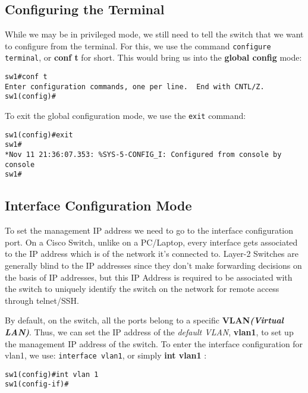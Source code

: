 \subsection{Configuring the Terminal}
While we may be in privileged mode, we still need to tell the switch that we want to configure from the terminal. For this, we use the command \verb|configure terminal|, or \textbf{conf t} for short. This would bring us into the \textbf{global config} mode:

\vspace{-15pt}
\begin{verbatim}
sw1#conf t
Enter configuration commands, one per line.  End with CNTL/Z.
sw1(config)#
\end{verbatim}
\vspace{-10pt}

\noindent
To exit the global configuration mode, we use the \verb|exit| command:

\vspace{-15pt}
\begin{verbatim}
sw1(config)#exit
sw1#
*Nov 11 21:36:07.353: %SYS-5-CONFIG_I: Configured from console by console
sw1#
\end{verbatim}
\vspace{-10pt}

\subsection{Interface Configuration Mode}
To set the management IP address we need to go to the interface configuration port. On a Cisco Switch, unlike on a PC/Laptop, every interface gets associated to the IP address which is of the network it's connected to. Layer-2 Switches are generally blind to the IP addresses since they don't make forwarding decisions on the basis of IP addresses, but this IP Address is required to be associated with the switch to uniquely identify the switch on the network for remote access through telnet/SSH. 

By default, on the switch, all the ports belong to a specific \textbf{VLAN\textit{(Virtual LAN)}}. Thus, we can set the IP address of the \textit{default VLAN}, \textbf{vlan1}, to set up the management IP address of the switch. To enter the interface configuration for vlan1, we use: \verb|interface vlan1|, or simply \textbf{int vlan1} :

\vspace{-15pt}
\begin{verbatim}
sw1(config)#int vlan 1
sw1(config-if)#
\end{verbatim}
\vspace{-10pt}

